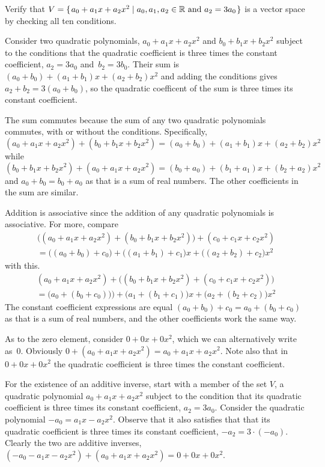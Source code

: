 \documentclass[answers]{examjh}
\begin{document}
\begin{questions}
\question
Verify that $V=\mbox{$\{\hspace{0.1em}a_0+a_1x+a_2x^2 \mid \text{$a_0,a_1,a_2\in\mathbb{R}$ and $a_2=3a_0$}\hspace{0.1em}\}$}$ 
is a vector space by checking all ten conditions.
\begin{solution}
Consider two quadratic polynomials, $a_0+a_1x+a_2x^2$ and
$b_0+b_1x+b_2x^2$ subject to the conditions that 
the quadratic coefficient is three times the constant coefficient, 
$a_2=3a_0$ and~$b_2=3b_0$.
Their sum is  $(a_0+b_0)+(a_1+b_1)x+(a_2+b_2)x^2$ and 
adding the conditions gives $a_2+b_2=3(a_0+b_0)$,
so the quadratic coefficent of the sum is three times its constant coefficient.

The sum commutes because the sum of any two quadratic polynomials commutes,
with or without the conditions.
Specifically,
\begin{equation*}
(a_0+a_1x+a_2x^2) + (b_0+b_1x+b_2x^2)
 = (a_0+b_0)+(a_1+b_1)x+(a_2+b_2)x^2
\end{equation*}
while
\begin{equation*}
 (b_0+b_1x+b_2x^2)+(a_0+a_1x+a_2x^2) 
 = (b_0+a_0)+(b_1+a_1)x+(b_2+a_2)x^2
\end{equation*} 
and $a_0+b_0=b_0+a_0$ as that is a sum of real numbers.
The other coefficients in the sum are similar.

Addition is associative since the addition of any quadratic polynomials 
is associative.
For more, compare
\begin{multline*}
 \big((a_0+a_1x+a_2x^2) + (b_0+b_1x+b_2x^2)\big)+ (c_0+c_1x+c_2x^2)   \\
 = \big((a_0+b_0)+c_0\big)+\big((a_1+b_1)+c_1\big)x+\big((a_2+b_2)+c_2\big)x^2
\end{multline*}
with this.
\begin{multline*}
 (a_0+a_1x+a_2x^2) + \big((b_0+b_1x+b_2x^2)+ (c_0+c_1x+c_2x^2)\big)     \\
 = \big(a_0+(b_0+c_0)\big))+\big(a_1+(b_1+c_1)\big)x+\big(a_2+(b_2+c_2)\big)x^2
\end{multline*}
The constant coefficient expressions are equal
$(a_0+b_0)+c_0=a_0+(b_0+c_0)$
as that is a sum of real numbers, and
the other coefficients work the same way.

As to the zero element, consider $0+0x+0x^2$, which we can 
alternatively write as~$0$.
Obviously $0+(a_0+a_1x+a_2x^2)=a_0+a_1x+a_2x^2$.
Note also that in $0+0x+0x^2$ the quadratic coefficient is three
times the constant coefficient.

For the existence of an additive inverse, start with a member
of the set $V$,  
a quadratic polynomial $a_0+a_1x+a_2x^2$ subject to the condition that its
quadratic coefficient is three times its constant coefficient, $a_2=3a_0$.
Consider the quadratic polynomial $-a_0=a_1x-a_2x^2$.
Observe that it also satisfies that that its
quadratic coefficient is three times its constant coefficient, 
$-a_2=3\cdot(-a_0)$.
Clearly the two are additive inverses, 
$(-a_0-a_1x-a_2x^2)+(a_0+a_1x+a_2x^2)=0+0x+0x^2$.


\end{solution}
\end{questions}
\end{document}
